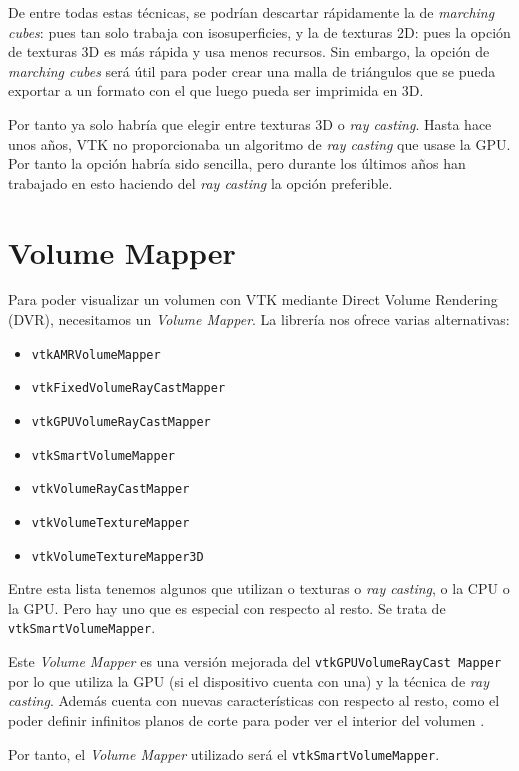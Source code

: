De entre todas estas técnicas, se podrían descartar rápidamente la de \textit{marching cubes}: pues tan solo trabaja con isosuperficies, y la de texturas 2D: pues la opción de texturas 3D es más rápida y usa menos recursos. Sin embargo, la opción de \textit{marching cubes} será útil para poder crear una malla de triángulos que se pueda exportar a un formato con el que luego pueda ser imprimida en 3D.

Por tanto ya solo habría que elegir entre texturas 3D o \textit{ray casting}. Hasta hace unos años, VTK no proporcionaba un algoritmo de \textit{ray casting} que usase la GPU. Por tanto la opción habría sido sencilla, pero durante los últimos años han trabajado en esto haciendo del \textit{ray casting} la opción preferible.

\section{Volume Mapper}

Para poder visualizar un volumen con VTK mediante Direct Volume Rendering (DVR), necesitamos un \textit{Volume Mapper}. La librería nos ofrece varias alternativas:
\begin{itemize}
	\item \texttt{vtkAMRVolumeMapper}
	\item \texttt{vtkFixedVolumeRayCastMapper}
	\item \texttt{vtkGPUVolumeRayCastMapper}
	\item \texttt{vtkSmartVolumeMapper}
	\item \texttt{vtkVolumeRayCastMapper}
	\item \texttt{vtkVolumeTextureMapper}
	\item \texttt{vtkVolumeTextureMapper3D}
\end{itemize}

Entre esta lista tenemos algunos que utilizan o texturas o \textit{ray casting}, o la CPU o la GPU. Pero hay uno que es especial con respecto al resto. Se trata de \texttt{vtkSmartVolumeMapper}.

Este \textit{Volume Mapper} es una versión mejorada del \texttt{vtkGPUVolumeRayCast Mapper} por lo que utiliza la GPU (si el dispositivo cuenta con una) y la técnica de \textit{ray casting}. Además cuenta con nuevas características con respecto al resto, como el poder definir infinitos planos de corte para poder ver el interior del volumen \cite{smart_volume_mapper}.

Por tanto, el \textit{Volume Mapper} utilizado será el \texttt{vtkSmartVolumeMapper}.

